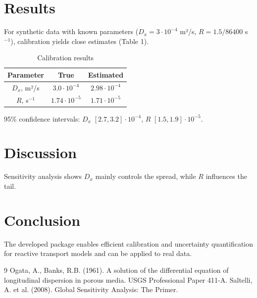 \documentclass[12pt,a4paper]{article}
\begin{document}
\section{Results}
For synthetic data with known parameters (\(D_x = 3\cdot10^{-4}\) m²/s, \(R = 1.5/86400\) s\(^{-1}\)), calibration yields close estimates (Table 1).
\begin{table}[h]
\centering
\caption{Calibration results}
\begin{tabular}{c|c|c}
Parameter & True & Estimated \\
\hline
\(D_x\), m²/s & \(3.0\cdot10^{-4}\) & \(2.98\cdot10^{-4}\) \\
\(R\), s\(^{-1}\) & \(1.74\cdot10^{-5}\) & \(1.71\cdot10^{-5}\) \\
\end{tabular}
\end{table}

95\% confidence intervals: \(D_x\) \([2.7, 3.2]\cdot10^{-4}\), \(R\) \([1.5, 1.9]\cdot10^{-5}\).

\section{Discussion}
Sensitivity analysis shows \(D_x\) mainly controls the spread, while \(R\) influences the tail.

\section{Conclusion}
The developed package enables efficient calibration and uncertainty quantification for reactive transport models and can be applied to real data.

\begin{thebibliography}{9}
 Ogata, A., Banks, R.B. (1961). A solution of the differential equation of longitudinal dispersion in porous media. USGS Professional Paper 411-A.
 Saltelli, A. et al. (2008). Global Sensitivity Analysis: The Primer.
\end{thebibliography}
\end{document}
